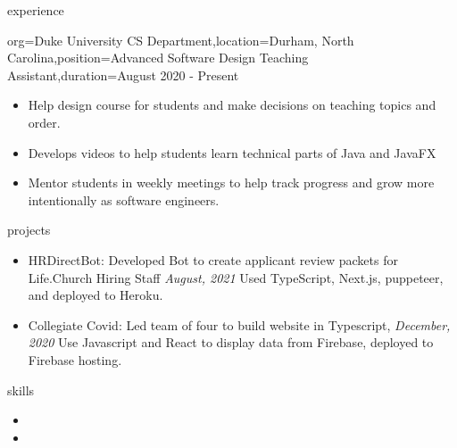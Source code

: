 \documentclass{resume}
\begin{document}
\begin{ResumeSection}{experience}
    \begin{ResumeSubsection}{org={Duke University CS Department},location={Durham, North Carolina},position={Advanced Software Design Teaching Assistant},duration={August 2020 - Present}}
        \begin{itemize}
            \item Help design course for students and make decisions on teaching topics and order.
            \item Develops videos to help students learn technical parts of Java and JavaFX
            \item Mentor students in weekly meetings to help track progress and grow more intentionally as software engineers.
        \end{itemize}

    \end{ResumeSubsection}
\end{ResumeSection}


\begin{ResumeSection}{projects}
    \begin{itemize}
        \item {HRDirectBot: Developed Bot to create applicant review packets for Life.Church Hiring Staff \hfill\em{August, 2021}}
            \linebreak
            Used TypeScript, Next.js, puppeteer, and deployed to Heroku.
        \item {Collegiate Covid: Led team of four to build website in Typescript, \hfill\em{December, 2020}}
            \linebreak
            \linebreak
            Use Javascript and React to display data from Firebase, deployed to Firebase hosting.
    \end{itemize}
\end{ResumeSection}

\begin{ResumeSection}{skills}
    \begin{ResumeSubsection}{}
        \begin{itemize}
            \item {}
            \item {}
        \end{itemize}
    \end{ResumeSubsection}
\end{ResumeSection}
\end{document}
